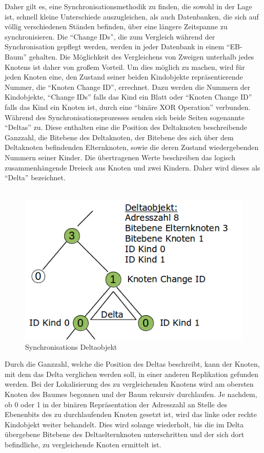 \documentclass[a4paper,11pt,oneside,%
headsepline,												%
footsepline,												%
bibtotocnumbered									%
]{scrreprt}
\begin{document}
Daher gilt es, eine Synchronisationsmethodik zu finden, die sowohl in der Lage ist, schnell kleine Unterschiede auszugleichen, als auch Datenbanken, die sich auf völlig verschiedenen Ständen befinden, über eine längere Zeitspanne zu synchronisieren.
Die \enquote{Change IDs}, die zum Vergleich während der Synchronisation gepflegt werden, werden in jeder Datenbank in einem \enquote{EB-Baum} gehalten. Die Möglichkeit des Vergleichens von Zweigen unterhalb jedes Knotens ist daher von großem Vorteil. Um dies möglich zu machen, wird für jeden Knoten eine, den Zustand seiner beiden Kindobjekte repräsentierende Nummer, die \enquote{Knoten Change ID}, errechnet.
 Dazu werden die Nummern der Kindobjekte, \enquote{Change IDs} falls das Kind ein Blatt oder \enquote{Knoten Change ID} falls das Kind ein Knoten ist, durch eine \enquote{binäre XOR Operation} verbunden. Während des Synchronisationsprozesses senden sich beide Seiten sogenannte \enquote{Deltas} zu. %
 Diese enthalten eine die Position des Deltaknoten beschreibende Ganzzahl, die Bitebene des  Deltaknoten, der Bitebene des sich über dem Deltaknoten befindenden Elternknoten, sowie die deren Zustand wiedergebenden Nummern seiner Kinder.
Die übertragenen Werte beschreiben das logisch zusammenhängende Dreieck aus Knoten und zwei Kindern. Daher wird dieses als \enquote{Delta} bezeichnet.\\\\
\begin{figure}[h!]
  \begin{center}
    \includegraphics[width=.5\linewidth]{bilder/SynchroDelta.png}
  \end{center}
 \caption{Synchronisations Deltaobjekt}
\end{figure}
Durch die Ganzzahl, welche die Position des Deltas beschreibt, kann der Knoten, mit dem das Delta verglichen werden soll, in einer anderen Replikation gefunden werden. Bei der Lokalisierung des zu vergleichenden Knotens wird am obersten Knoten des Baumes begonnen und der Baum rekursiv durchlaufen. Je nachdem, ob 0 oder 1 in der binären Repräsentation der Adresszahl an Stelle des Ebenenbits des zu durchlaufenden Knoten gesetzt ist, wird das linke oder rechte Kindobjekt weiter behandelt. Dies wird solange wiederholt, bis die im Delta übergebene Bitebene des Deltaelternknoten unterschritten und der sich dort befindliche, zu vergleichende Knoten ermittelt ist.
\end{document}
